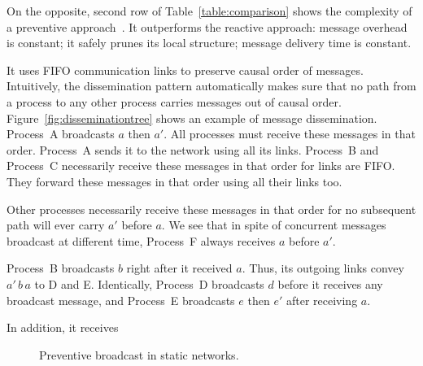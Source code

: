 


On the opposite, second row of Table~\ref{table:comparison} shows the complexity
of a preventive approach~\cite{friedman2004causal}. It outperforms the reactive
approach: message overhead is constant; it safely prunes its local structure;
message delivery time is constant.

It uses FIFO communication links to preserve causal order of
messages. Intuitively, the dissemination pattern automatically makes sure that
no path from a process to any other process carries messages out of causal
order. Figure~\ref{fig:disseminationtree} shows an example of message
dissemination. Process~A broadcasts $a$ then $a'$. All processes must receive
these messages in that order. Process~A sends it to the network using all its
links. Process~B and Process~C necessarily receive these messages in that order
for links are FIFO. They forward these messages in that order using all their
links too.

Other processes necessarily receive these messages in that order for no
subsequent path will ever carry $a'$ before $a$.  We see that in spite of
concurrent messages broadcast at different time, Process~F always receives $a$
before $a'$.


Process~B broadcasts $b$ right after it received $a$. Thus, its outgoing links
convey $a'\,b\,a$ to D and E. Identically, Process~D broadcasts $d$ before it
receives any broadcast message, and Process~E broadcasts $e$ then $e'$ after
receiving $a$.


In addition, it receives


\begin{figure}
  \begin{center}
    
    \caption{\label{fig:static}Preventive broadcast in static networks.}
  \end{center}
\end{figure}



